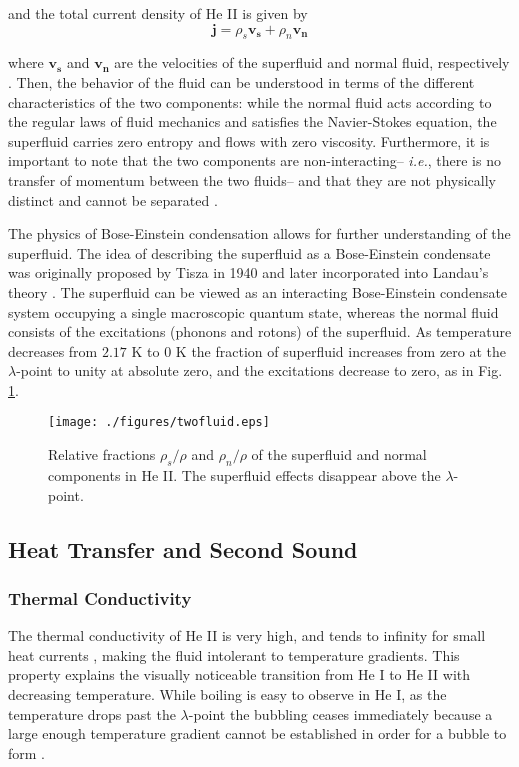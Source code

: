 and the total current density of He II is given by
\begin{equation}
\mathbf{j} = \rho_s\mathbf{v_s} + \rho_n\mathbf{v_n}
\end{equation}

where $\mathbf{v_s}$ and $\mathbf{v_n}$ are the velocities of the
superfluid and normal fluid, respectively \cite{tilley}. Then, the
behavior of the fluid can be understood in terms of the different
characteristics of the two components: while the normal fluid acts
according to the regular laws of fluid mechanics and satisfies the
Navier-Stokes equation, the superfluid carries zero entropy and flows
with zero viscosity. Furthermore, it is important to note that the two
components are non-interacting-- \emph{i.e.}, there is no transfer of
momentum between the two fluids-- and that they are
not physically distinct and cannot be separated \cite{tilley}.

The physics of Bose-Einstein condensation allows for further
understanding of the superfluid. The idea of describing the superfluid
as a Bose-Einstein condensate was originally proposed by Tisza in 1940
and later incorporated into Landau's theory \cite{tisza}. The
superfluid can be viewed as an interacting Bose-Einstein condensate
system occupying a single macroscopic quantum state, whereas the
normal fluid consists of the excitations (phonons and rotons) of the
superfluid. As temperature decreases from $2.17$ K to $0$ K the fraction
of superfluid increases from zero at the $\lambda$-point to unity at
absolute zero, and the excitations decrease to zero, as in Fig.
\ref{fig:twofluid}\cite{andro}.

\begin{figure}[ht]
\begin{center}
\texttt{[image: ./figures/twofluid.eps]}
\caption{\small{Relative fractions $\rho_s/\rho$ and $\rho_n/\rho$ of
    the superfluid and normal components in He II\cite{andro}. The
    superfluid effects disappear above the $\lambda$-point.}}
\label{fig:twofluid}
\end{center}
\end{figure}


\subsection{Heat Transfer and Second Sound}\label{heattransferandsecondsound}

\subsubsection{Thermal Conductivity}\label{thermalconductivity}
The thermal conductivity of He II is very high, and tends to infinity
for small heat currents \cite{tilley}, making the fluid intolerant to
temperature gradients. This property explains the visually noticeable
transition from He I to He II with decreasing temperature.  While
boiling is easy to observe in He I, as the temperature drops past the
$\lambda$-point the bubbling ceases immediately because a large enough
temperature gradient cannot be established in order for a bubble to
form \cite{tilley}.


